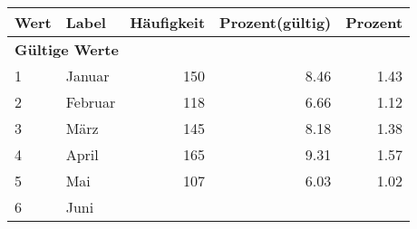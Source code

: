      \begin{longtable}{lXrrr}
     \toprule
     \textbf{Wert} & \textbf{Label} & \textbf{Häufigkeit} & \textbf{Prozent(gültig)} & \textbf{Prozent} \\
     \endhead
     \midrule
     \multicolumn{5}{l}{\textbf{Gültige Werte}}\\

     1 &
     \multicolumn{1}{X}{ Januar   } &


       \num{150} &
       \num[round-mode=places,round-precision=2]{8,46} &
         \num[round-mode=places,round-precision=2]{1,43} \\

     2 &
     \multicolumn{1}{X}{ Februar   } &


       \num{118} &
       \num[round-mode=places,round-precision=2]{6,66} &
         \num[round-mode=places,round-precision=2]{1,12} \\

     3 &
     \multicolumn{1}{X}{ März   } &


       \num{145} &
       \num[round-mode=places,round-precision=2]{8,18} &
         \num[round-mode=places,round-precision=2]{1,38} \\

     4 &
     \multicolumn{1}{X}{ April   } &


       \num{165} &
       \num[round-mode=places,round-precision=2]{9,31} &
         \num[round-mode=places,round-precision=2]{1,57} \\

     5 &
     \multicolumn{1}{X}{ Mai   } &


       \num{107} &
       \num[round-mode=places,round-precision=2]{6,03} &
         \num[round-mode=places,round-precision=2]{1,02} \\

     6 &
     \multicolumn{1}{X}{ Juni   } &



\end{longtable}
